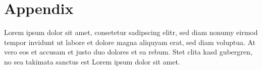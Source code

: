 \documentclass{article}
\begin{document}
    \section{Appendix}
        Lorem ipsum dolor sit amet, consetetur sadipscing elitr, sed diam nonumy eirmod
        tempor invidunt ut labore et dolore magna aliquyam erat, sed diam voluptua. At
        vero eos et accusam et justo duo dolores et ea rebum. Stet clita kasd gubergren,
        no sea takimata sanctus est Lorem ipsum dolor sit amet.
    
\end{document}
